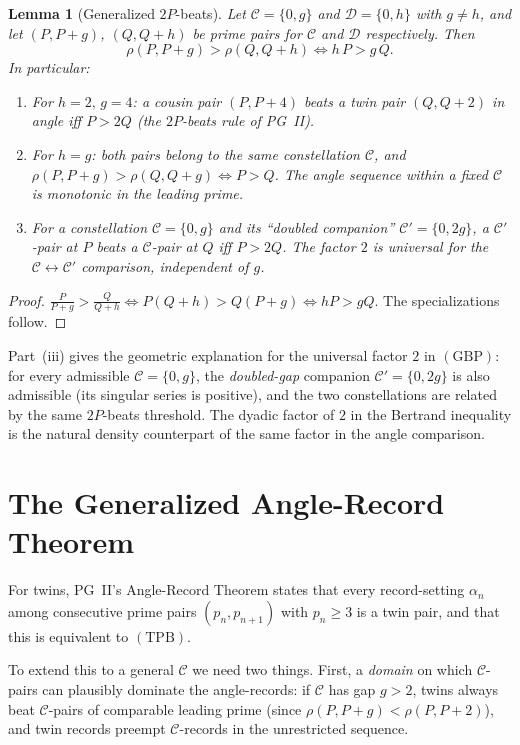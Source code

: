 \documentclass[11pt]{article}
\newtheorem{lemma}[theorem]{Lemma}
\begin{document}
\begin{lemma}[Generalized $2P$-beats]\label{lem:gen2P}
Let $\mathcal{C}=\{0,g\}$ and $\mathcal{D}=\{0,h\}$ with $g\ne h$, and
let $(P,P+g)$, $(Q,Q+h)$ be prime pairs for $\mathcal{C}$ and
$\mathcal{D}$ respectively. Then
\[
\rho(P,P+g)>\rho(Q,Q+h)\iff h\,P>g\,Q.
\]
In particular:
\begin{enumerate}
\item[(i)] For $h=2,\,g=4$: a cousin pair $(P,P+4)$ beats a twin pair
$(Q,Q+2)$ in angle iff $P>2Q$ (the $2P$-beats rule of PG~II).
\item[(ii)] For $h=g$: both pairs belong to the same constellation
$\mathcal{C}$, and $\rho(P,P+g)>\rho(Q,Q+g)\iff P>Q$. The angle
sequence within a fixed $\mathcal{C}$ is monotonic in the leading
prime.
\item[(iii)] For a constellation $\mathcal{C}=\{0,g\}$ and its
``doubled companion'' $\mathcal{C}'=\{0,2g\}$, a $\mathcal{C}'$-pair
at $P$ beats a $\mathcal{C}$-pair at $Q$ iff $P>2Q$. The factor $2$
is universal for the $\mathcal{C}\leftrightarrow\mathcal{C}'$
comparison, independent of $g$.
\end{enumerate}
\end{lemma}

\begin{proof}
$\frac{P}{P+g}>\frac{Q}{Q+h}\iff P(Q+h)>Q(P+g)\iff hP>gQ$. The
specializations follow.
\end{proof}

Part~(iii) gives the geometric explanation for the universal factor
$2$ in $(\mathrm{GBP})$: for every admissible $\mathcal{C}=\{0,g\}$,
the \emph{doubled-gap} companion $\mathcal{C}'=\{0,2g\}$ is also
admissible (its singular series is positive), and the two
constellations are related by the same $2P$-beats threshold. The
dyadic factor of $2$ in the Bertrand inequality is the natural
density counterpart of the same factor in the angle comparison.

\section{The Generalized Angle-Record Theorem}\label{sec:gen-angle}

For twins, PG~II's Angle-Record Theorem states that every record-setting
$\alpha_n$ among consecutive prime pairs $(p_n,p_{n+1})$ with
$p_n\ge 3$ is a twin pair, and that this is equivalent to
$(\mathrm{TPB})$.

To extend this to a general $\mathcal{C}$ we need two things. First,
a \emph{domain} on which $\mathcal{C}$-pairs can plausibly dominate
the angle-records: if $\mathcal{C}$ has gap $g>2$, twins always beat
$\mathcal{C}$-pairs of comparable leading prime
(since $\rho(P,P+g)<\rho(P,P+2)$), and twin records preempt
$\mathcal{C}$-records in the unrestricted sequence.
\end{document}
